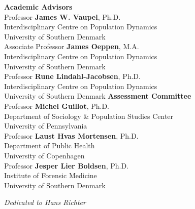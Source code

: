\documentclass[10pt, twoside]{book}
\begin{document}
{\noindent\footnotesize
  \textbf{\Large Academic Advisors}
  \vspace{0.5cm}\\
  Professor \textbf{James W. Vaupel}, Ph.D.\\
  Interdisciplinary Centre on Population Dynamics\\
  University of Southern Denmark
  \vspace{0.4cm}\\
  Associate Professor \textbf{James Oeppen}, M.A.\\
  Interdisciplinary Centre on Population Dynamics\\
  University of Southern Denmark
  \vspace{0.4cm}\\
  Professor \textbf{Rune Lindahl-Jacobsen}, Ph.D.\\
  Interdisciplinary Centre on Population Dynamics\\
  University of Southern Denmark
}
\vfill
{\noindent\footnotesize
  \textbf{\Large Assessment Committee}
  \vspace{0.5cm}\\
  Professor \textbf{Michel Guillot}, Ph.D.\\
  Department of Sociology \& Population Studies Center\\
  University of Pennsylvania
  \vspace{0.4cm}\\
  Professor \textbf{Laust Hvas Mortensen}, Ph.D.\\
  Department of Public Health\\
  University of Copenhagen
  \vspace{0.4cm}\\
  Professor \textbf{Jesper Lier Boldsen}, Ph.D.\\
  Institute of Forensic Medicine\\
  University of Southern Denmark
}

\clearpage


{
\itshape
\raggedleft
Dedicated to Hans Richter
\par
{}
}
   
\clearpage

\end{document}
